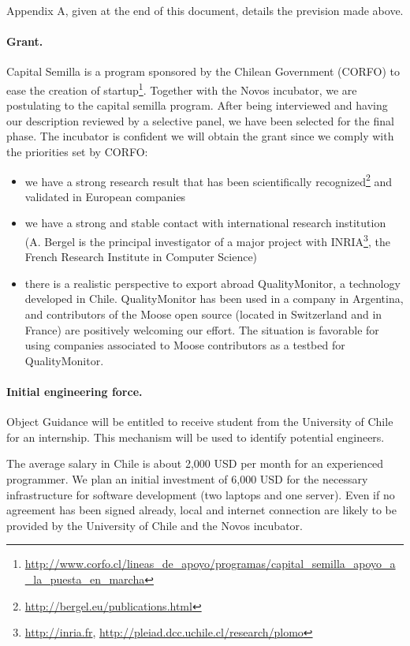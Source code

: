 \documentclass[runningheads]{llncs}
\begin{document}
Appendix A, given at the end of this document, details the prevision made above.

\paragraph{Grant.} Capital Semilla is a program sponsored by the Chilean Government (CORFO) to ease the creation of startup\footnote{\url{http://www.corfo.cl/lineas_de_apoyo/programas/capital_semilla_apoyo_a_la_puesta_en_marcha}}. Together with the Novos incubator, we are postulating to the capital semilla program. After being interviewed and  having our description reviewed by a selective panel, we have been selected for the final phase. The incubator is confident we will obtain the grant since we comply with the priorities set by CORFO: 
\begin{itemize}
\item we have a strong research result that has been scientifically recognized\footnote{\url{http://bergel.eu/publications.html}} and validated in European companies
\item we have a strong and stable contact with international research institution (A. Bergel is the principal investigator of a major project with INRIA\footnote{\url{http://inria.fr}, \url{http://pleiad.dcc.uchile.cl/research/plomo}}, the French Research Institute in Computer Science)
\item there is a realistic perspective to export abroad QualityMonitor, a technology developed in Chile. QualityMonitor has been used in a company in Argentina, and contributors of the Moose open source (located in Switzerland and in France) are positively welcoming our effort. The situation is favorable for using companies associated to Moose contributors as a testbed for QualityMonitor.
\end{itemize}

\paragraph{Initial engineering force.} Object Guidance will be entitled to receive student from the University of Chile for an internship. This mechanism will be used to identify potential engineers.

The average salary in Chile is about 2,000 USD per month for an experienced programmer. We plan an initial investment of 6,000 USD for the necessary infrastructure for software development (two laptops and one server). Even if no agreement has been signed already, local and internet connection are likely to be provided by the University of Chile and the Novos incubator. 
\end{document}
